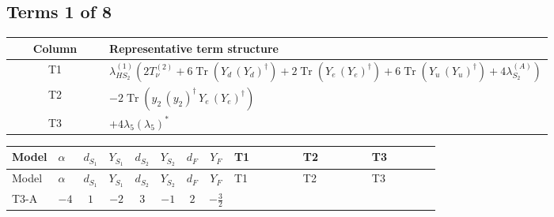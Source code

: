 \documentclass[8pt]{article}
\begin{document}
\begin{landscape}
\subsection*{Terms 1 of 8}
\begin{center}
\begin{tabular}{@{}c >{\raggedright\arraybackslash}p{0.82\linewidth}@{}}
\toprule
Column & Representative term structure \\
\midrule
T1 & \(\displaystyle {\lambda_{HS_2}^{(1)}} (2 T_{\nu}^{(2)}+6 \operatorname{Tr}\!\left({Y_d}\,\left({Y_d}\right)^{\dagger}\right)+2 \operatorname{Tr}\!\left({Y_e}\,\left({Y_e}\right)^{\dagger}\right)+6 \operatorname{Tr}\!\left({Y_u}\,\left({Y_u}\right)^{\dagger}\right)+4 {\lambda_{S_2}^{(A)}})\) \\
\midrule
T2 & \(\displaystyle -2 \operatorname{Tr}\!\left({y_2}\,\left({y_2}\right)^{\dagger}\,{Y_e}\,\left({Y_e}\right)^{\dagger}\right)\) \\
\midrule
T3 & \(\displaystyle +4 {\lambda_5} \left({\lambda_5}\right)^{*}\) \\
\midrule
\bottomrule
\end{tabular}
\end{center}
\smallskip
\tiny
\begin{longtable}{@{}llcccccc >{\raggedright\arraybackslash}p{0.21\linewidth} >{\raggedright\arraybackslash}p{0.21\linewidth} >{\raggedright\arraybackslash}p{0.21\linewidth}@{}}
\toprule
Model & $\alpha$ & $d_{S_1}$ & $Y_{S_1}$ & $d_{S_2}$ & $Y_{S_2}$ & $d_F$ & $Y_F$ & T1 & T2 & T3 \\
\midrule
\endfirsthead
\toprule
Model & $\alpha$ & $d_{S_1}$ & $Y_{S_1}$ & $d_{S_2}$ & $Y_{S_2}$ & $d_F$ & $Y_F$ & T1 & T2 & T3 \\
\midrule
\endhead
T3-A & $-4$ & $1$ & $-2$ & $3$ & $-1$ & $2$ & $-\frac{3}{2}$ & \scriptsize\adjustbox{max width=\linewidth}{$\begin{gathered} {\lambda_{HS_2}^{(1)}} (2 T_{\nu}^{(2)}+6 \operatorname{Tr}\!\left({Y_d}\,\left({Y_d}\right)^{\dagger}\right)+2 \operatorname{Tr}\!\left({Y_e}\,\left({Y_e}\right)^{\dagger}\right)+6 \operatorname{Tr}\!\left({Y_u}\,\left({Y_u}\right)^{\dagger}\right)+4 {\lambda_{S_2}^{(A)}})\end{gathered}$} & \scriptsize\adjustbox{max width=\linewidth}{$\begin{gathered} -2 \operatorname{Tr}\!\left({y_2}\,\left({y_2}\right)^{\dagger}\,{Y_e}\,\left({Y_e}\right)^{\dagger}\right)\end{gathered}$} & \scriptsize\adjustbox{max width=\linewidth}{$\begin{gathered} +4 {\lambda_5} \left({\lambda_5}\right)^{*}\end{gathered}$} \\

\end{longtable}
\end{landscape}
\end{document}
